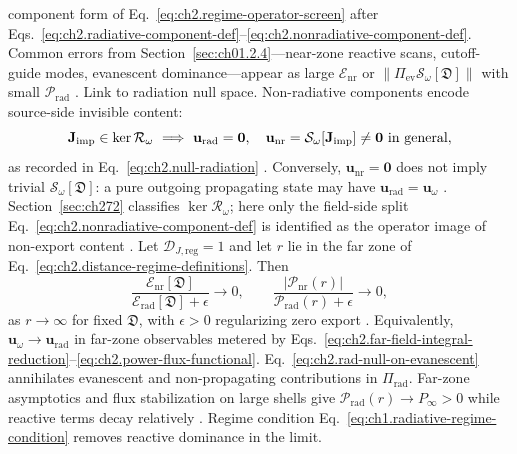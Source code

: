 component form of Eq.~\eqref{eq:ch2.regime-operator-screen} after
Eqs.~\eqref{eq:ch2.radiative-component-def}--\eqref{eq:ch2.nonradiative-component-def}.
Common errors from Section~\ref{sec:ch01.2.4}---near-zone reactive scans, cutoff-guide
modes, evanescent dominance---appear as large \(\mathcal{E}_{\mathrm{nr}}\) or
\(\|\Pi_{\mathrm{ev}}\mathcal{S}_\omega[\mathfrak{D}]\|\) with small
\(\mathcal{P}_{\mathrm{rad}}\) \cite{stratton1941}. Link to radiation null space. Non-radiative components encode source-side invisible content:
\begin{equation}
\label{eq:ch2.nr-image-of-null-space}
\Jimp\in\ker\mathcal{R}_\omega
\ \Longrightarrow\
\mathbf{u}_{\mathrm{rad}}=\mathbf{0},
\quad
\mathbf{u}_{\mathrm{nr}}=\mathcal{S}_\omega[\Jimp]\neq\mathbf{0}\ \text{in general},
\end{equation}
as recorded in Eq.~\eqref{eq:ch2.null-radiation} \cite{harrington2001}.
Conversely, \(\mathbf{u}_{\mathrm{nr}}=\mathbf{0}\) does not imply trivial
\(\mathcal{S}_\omega[\mathfrak{D}]\): a pure outgoing propagating state may have
\(\mathbf{u}_{\mathrm{rad}}=\mathbf{u}_\omega\) \cite{stratton1941}. Section~\ref{sec:ch272}
classifies \(\ker\mathcal{R}_\omega\); here only the field-side split
Eq.~\eqref{eq:ch2.nonradiative-component-def} is identified as the operator image of
non-export content \cite{harrington2001}.
\label{prop:ch2.far-zone-radiative-dominance}
Let \(\mathcal{D}_{J,\mathrm{reg}}=1\) and let \(r\) lie in the far zone of
Eq.~\eqref{eq:ch2.distance-regime-definitions}. Then
\begin{equation}
\label{eq:ch2.far-zone-component-dominance}
\frac{\mathcal{E}_{\mathrm{nr}}[\mathfrak{D}]}{\mathcal{E}_{\mathrm{rad}}[\mathfrak{D}]+\epsilon}
\to 0,
\qquad
\frac{|\mathcal{P}_{\mathrm{nr}}(r)|}{\mathcal{P}_{\mathrm{rad}}(r)+\epsilon}\to 0,
\end{equation}
as \(r\to\infty\) for fixed \(\mathfrak{D}\), with \(\epsilon>0\) regularizing zero export
\cite{stratton1941}. Equivalently, \(\mathbf{u}_\omega\to\mathbf{u}_{\mathrm{rad}}\) in
far-zone observables metered by Eqs.~\eqref{eq:ch2.far-field-integral-reduction}--\eqref{eq:ch2.power-flux-functional}.
Eq.~\eqref{eq:ch2.rad-null-on-evanescent} annihilates evanescent and non-propagating
contributions in \(\Pi_{\mathrm{rad}}\). Far-zone asymptotics and flux stabilization on
large shells give \(\mathcal{P}_{\mathrm{rad}}(r)\to P_\infty>0\) while reactive terms decay
relatively \cite{stratton1941}. Regime condition
Eq.~\eqref{eq:ch1.radiative-regime-condition} removes reactive dominance in the limit.
